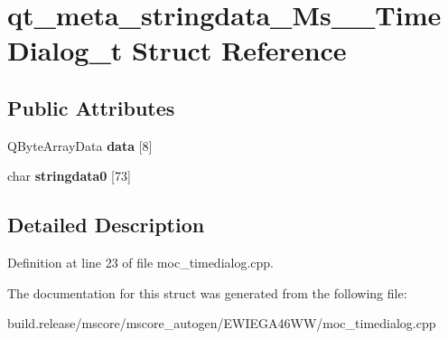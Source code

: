 \hypertarget{structqt__meta__stringdata___ms_____time_dialog__t}{}\section{qt\+\_\+meta\+\_\+stringdata\+\_\+\+Ms\+\_\+\+\_\+\+Time\+Dialog\+\_\+t Struct Reference}
\label{structqt__meta__stringdata___ms_____time_dialog__t}
\subsection*{Public Attributes}
\begin{DoxyCompactItemize}
\item 
\mbox{\label{structqt__meta__stringdata___ms_____time_dialog__t_a4f098855c1bc3ce6d16925147ba42bbc}} 
Q\+Byte\+Array\+Data {\bfseries data} \mbox{[}8\mbox{]}
\item 
\mbox{\label{structqt__meta__stringdata___ms_____time_dialog__t_aed6ef87b6ce93c9be4a214201afc9f9c}} 
char {\bfseries stringdata0} \mbox{[}73\mbox{]}
\end{DoxyCompactItemize}


\subsection{Detailed Description}


Definition at line 23 of file moc\+\_\+timedialog.\+cpp.



The documentation for this struct was generated from the following file\+:\begin{DoxyCompactItemize}
\item 
build.\+release/mscore/mscore\+\_\+autogen/\+E\+W\+I\+E\+G\+A46\+W\+W/moc\+\_\+timedialog.\+cpp\end{DoxyCompactItemize}

